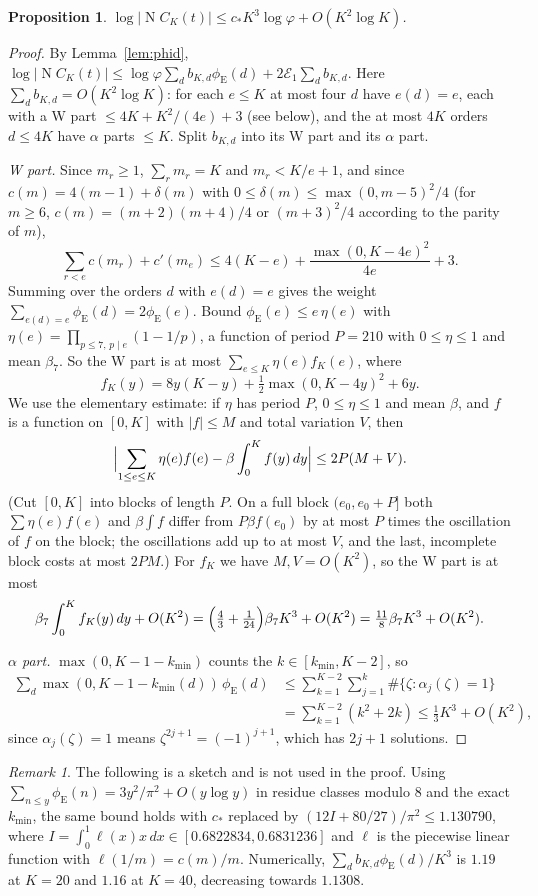\documentclass[11pt]{amsart}
\newtheorem{proposition}[theorem]{Proposition}
\theoremstyle{definition}
\theoremstyle{remark}
\newtheorem{remark}[theorem]{Remark}
\numberwithin{equation}{section}
\newcommand{\Nm}{\operatorname{N}}
\newcommand{\eu}{\phi_{\mathrm E}}
\begin{document}
\begin{proposition}\label{prop:cost}
$\log|\Nm C_K(t)|\le c_*K^3\log\varphi+O(K^2\log K)$.
\end{proposition}
\begin{proof}
By Lemma~\ref{lem:phid}, $\log|\Nm C_K(t)|\le\log\varphi\sum_db_{K,d}\eu(d)+2\mathcal E_1\sum_db_{K,d}$. Here
$\sum_db_{K,d}=O(K^2\log K)$: for each $e\le K$ at most four $d$ have $e(d)=e$, each with a W part
$\le4K+K^2/(4e)+3$ (see below), and the at most $4K$ orders $d\le4K$ have $\alpha$ parts $\le K$. Split
$b_{K,d}$ into its W part and its $\alpha$ part.

\emph{W part.} Since $m_r\ge1$, $\sum_rm_r=K$ and $m_r<K/e+1$, and since $c(m)=4(m-1)+\delta(m)$ with
$0\le\delta(m)\le\max(0,m-5)^2/4$ (for $m\ge6$, $c(m)=(m+2)(m+4)/4$ or $(m+3)^2/4$ according to the parity of $m$),
\[
\sum_{r<e}c(m_r)+c'(m_e)\le4(K-e)+\frac{\max(0,K-4e)^2}{4e}+3.
\]
Summing over the orders $d$ with $e(d)=e$ gives the weight $\sum_{e(d)=e}\eu(d)=2\eu(e)$. Bound $\eu(e)\le e\,\eta(e)$
with $\eta(e)=\prod_{p\le7,\,p\mid e}(1-1/p)$, a function of period $P=210$ with $0\le\eta\le1$ and mean $\beta_7$. So
the W part is at most $\sum_{e\le K}\eta(e)f_K(e)$, where
\[
f_K(y)=8y(K-y)+\tfrac12\max(0,K-4y)^2+6y .
\]
We use the elementary estimate: if $\eta$ has period $P$, $0\le\eta\le1$ and mean $\beta$, and $f$ is a function on
$[0,K]$ with $|f|\le M$ and total variation $V$, then
\[
\Bigl|\sum_{1\le e\le K}\eta(e)f(e)-\beta\int_0^Kf(y)\,dy\Bigr|\le2P(M+V).
\]
(Cut $[0,K]$ into blocks of length $P$. On a full block $(e_0,e_0+P]$ both $\sum\eta(e)f(e)$ and
$\beta\int f$ differ from $P\beta f(e_0)$ by at most $P$ times the oscillation of $f$ on the block; the oscillations
add up to at most $V$, and the last, incomplete block costs at most $2PM$.) For $f_K$ we have $M,V=O(K^2)$, so the W
part is at most
\[
\beta_7\int_0^Kf_K(y)\,dy+O(K^2)=\Bigl(\tfrac43+\tfrac1{24}\Bigr)\beta_7K^3+O(K^2)=\tfrac{11}8\beta_7K^3+O(K^2).
\]

\emph{$\alpha$ part.} $\max(0,K-1-k_{\min})$ counts the $k\in[k_{\min},K-2]$, so
\begin{align*}
\sum_d\max(0,K-1-k_{\min}(d))\,\eu(d)&\le\sum_{k=1}^{K-2}\sum_{j=1}^k\#\{\zeta:\alpha_j(\zeta)=1\}\\
&=\sum_{k=1}^{K-2}(k^2+2k)\le\tfrac13K^3+O(K^2),
\end{align*}
since $\alpha_j(\zeta)=1$ means $\zeta^{2j+1}=(-1)^{j+1}$, which has $2j+1$ solutions.
\end{proof}

\begin{remark}\label{rem:sharp}
The following is a sketch and is not used in the proof. Using $\sum_{n\le y}\eu(n)=3y^2/\pi^2+O(y\log y)$ in residue
classes modulo $8$ and the exact $k_{\min}$, the same bound holds with $c_*$ replaced by
$(12I+80/27)/\pi^2\le1.130790$, where $I=\int_0^1\ell(x)x\,dx\in[0.6822834,0.6831236]$ and $\ell$ is the piecewise
linear function with $\ell(1/m)=c(m)/m$. Numerically, $\sum_db_{K,d}\eu(d)/K^3$ is $1.19$ at $K=20$ and $1.16$ at
$K=40$, decreasing towards $1.1308$.
\end{remark}
\end{document}
